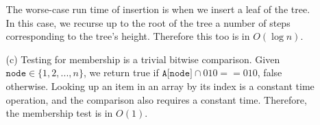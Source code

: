\documentclass{article}
\begin{document}
\begin{enumerate}
\begin{enumerate}
            The worse-case run time of insertion is when we insert a leaf of the tree. In this case, we recurse up to the root of the tree a number of steps corresponding to the tree's height. Therefore this too is in $O(\log n)$.

        \item [(c)] Testing for membership is a trivial bitwise comparison. Given $\texttt{node} \in \{1, 2, ..., n\}$, we return true if $\texttt{A[node]} \cap 010 == 010$, false otherwise. Looking up an item in an array by its index is a constant time operation, and the comparison also requires a constant time. Therefore, the membership test is in $O(1)$.
    \end{enumerate}
\end{enumerate}
\end{document}
